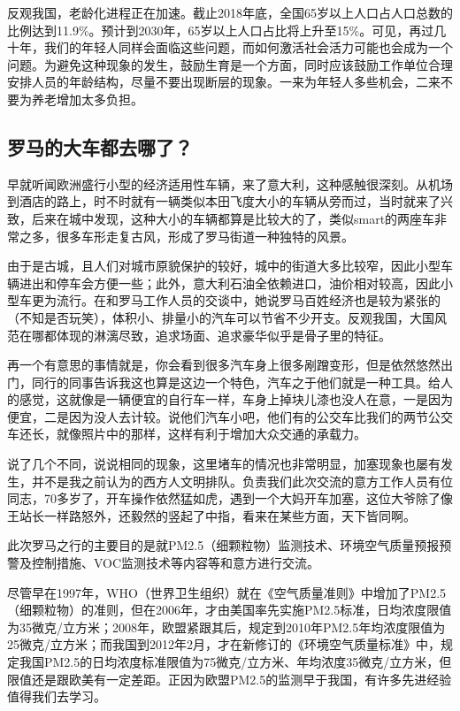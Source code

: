 \documentclass[
]{book}
\begin{document}
反观我国，老龄化进程正在加速。截止2018年底，全国65岁以上人口占人口总数的比例达到11.9\%。预计到2030年，65岁以上人口占比将上升至15\%。可见，再过几十年，我们的年轻人同样会面临这些问题，而如何激活社会活力可能也会成为一个问题。为避免这种现象的发生，鼓励生育是一个方面，同时应该鼓励工作单位合理安排人员的年龄结构，尽量不要出现断层的现象。一来为年轻人多些机会，二来不要为养老增加太多负担。

\hypertarget{ux7f57ux9a6cux7684ux5927ux8f66ux90fdux53bbux54eaux4e86}{%
\subsection{罗马的大车都去哪了？}\label{ux7f57ux9a6cux7684ux5927ux8f66ux90fdux53bbux54eaux4e86}}

早就听闻欧洲盛行小型的经济适用性车辆，来了意大利，这种感触很深刻。从机场到酒店的路上，时不时就有一辆类似本田飞度大小的车辆从旁而过，当时就来了兴致，后来在城中发现，这种大小的车辆都算是比较大的了，类似smart的两座车非常之多，很多车形走复古风，形成了罗马街道一种独特的风景。

由于是古城，且人们对城市原貌保护的较好，城中的街道大多比较窄，因此小型车辆进出和停车会方便一些；此外，意大利石油全依赖进口，油价相对较高，因此小型车更为流行。在和罗马工作人员的交谈中，她说罗马百姓经济也是较为紧张的（不知是否玩笑），体积小、排量小的汽车可以节省不少开支。反观我国，大国风范在哪都体现的淋漓尽致，追求场面、追求豪华似乎是骨子里的特征。

再一个有意思的事情就是，你会看到很多汽车身上很多剐蹭变形，但是依然悠然出门，同行的同事告诉我这也算是这边一个特色，汽车之于他们就是一种工具。给人的感觉，这就像是一辆便宜的自行车一样，车身上掉块儿漆也没人在意，一是因为便宜，二是因为没人去计较。说他们汽车小吧，他们有的公交车比我们的两节公交车还长，就像照片中的那样，这样有利于增加大众交通的承载力。

说了几个不同，说说相同的现象，这里堵车的情况也非常明显，加塞现象也屡有发生，并不是我之前认为的西方人文明排队。负责我们此次交流的意方工作人员有位同志，70多岁了，开车操作依然猛如虎，遇到一个大妈开车加塞，这位大爷除了像王站长一样路怒外，还毅然的竖起了中指，看来在某些方面，天下皆同啊。

此次罗马之行的主要目的是就PM2.5（细颗粒物）监测技术、环境空气质量预报预警及控制措施、VOC监测技术等内容等和意方进行交流。

尽管早在1997年，WHO（世界卫生组织）就在《空气质量准则》中增加了PM2.5（细颗粒物）的准则，但在2006年，才由美国率先实施PM2.5标准，日均浓度限值为35微克/立方米；2008年，欧盟紧跟其后，规定到2010年PM2.5年均浓度限值为25微克/立方米；而我国到2012年2月，才在新修订的《环境空气质量标准》中，规定我国PM2.5的日均浓度标准限值为75微克/立方米、年均浓度35微克/立方米，但限值还是跟欧美有一定差距。正因为欧盟PM2.5的监测早于我国，有许多先进经验值得我们去学习。
\end{document}
